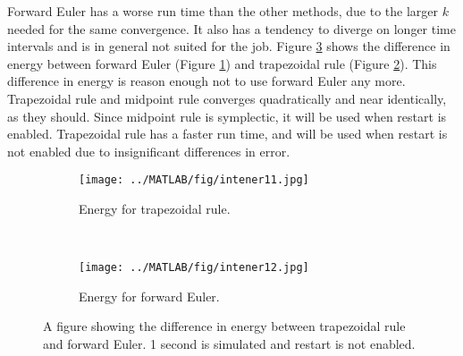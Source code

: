 \noindent Forward Euler has a worse run time than the other methods, due to the larger $k$ needed for the same convergence. It also has a tendency to diverge on longer time intervals and is in general not suited for the job. Figure \ref{fig:forwardenergy} shows the difference in energy between forward Euler (Figure \ref{fig:fe1}) and trapezoidal rule (Figure \ref{fig:fe2}). This difference in energy is reason enough not to use forward Euler any more.\\

\noindent Trapezoidal rule and midpoint rule converges quadratically and near identically, as they should. Since midpoint rule is symplectic, it will be used when restart is enabled. Trapezoidal rule has a faster run time, and will be used when restart is not enabled due to insignificant differences in error.%

\begin{figure}[H]
        \centering
        \begin{subfigure}[b]{0.3\textwidth}
                \texttt{[image: ../MATLAB/fig/intener11.jpg]}
                \caption{ Energy for trapezoidal rule. }
                \label{fig:fe1}
        \end{subfigure}
        ~
        \begin{subfigure}[b]{0.3\textwidth}
                \texttt{[image: ../MATLAB/fig/intener12.jpg]}
                \caption{ Energy for forward Euler. }  
				\label{fig:fe2}
        \end{subfigure}                
\caption{ A figure showing the difference in energy between trapezoidal rule and forward Euler. 1 second is simulated and restart is not enabled. }
\label{fig:forwardenergy}
\end{figure}

